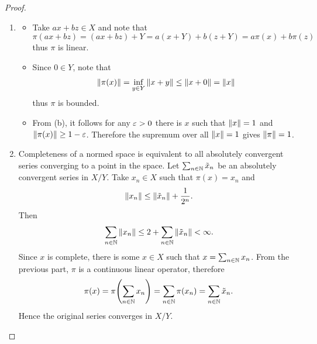 \documentclass[hw_all.tex]{subfiles}
\begin{document}
\begin{proof}
\begin{enumerate}
        \item 
            \begin{itemize}
                \item
                    Take $ax + bz \in X$ and note that
                    \[
                        \pi(ax + bz) = (ax + bz) + Y = a(x + Y) + b(z + Y) = a \pi(x) + b \pi(z)
                    \]
                    thus $\pi$ is linear.

                \item 
                    Since $0 \in Y$, note that
                    \[
                        \norm{\pi(x)} = \inf_{y \in Y} \norm{x + y} \leq \norm{x + 0} = \norm{x}
                    \]
                    thus $\pi$ is bounded.

                \item 
                    From (b), it follows for any $\varepsilon > 0$ there is $x$ such that $\norm{x} = 1$ and $\norm{\pi(x)} \geq 1 - \varepsilon$. Therefore the supremum over all $\norm{x} = 1$ gives $\norm{\pi} = 1$.
            \end{itemize}

        \item 
            Completeness of a normed space is equivalent to all absolutely convergent series converging to a point in the space. Let $\sum_{n \in \mathbb{N}} \tilde{x}_n$ be an absolutely convergent series in $X / Y$. Take $x_n \in X$ such that $\pi(x) = x_n$ and
            \[
                \norm{x_n} \leq \norm{\tilde{x}_n} + \frac{1}{2^n}
            .\]
            Then
            \[
                \sum_{n \in \mathbb{N}} \norm{x_n} \leq 2 + \sum_{n \in \mathbb{N}} \norm{\tilde{x}_n} < \infty
            .\]
            Since $x$ is complete, there is some $x \in X$ such that $x = \sum_{n \in \mathbb{N}} x_n$. From the previous part, $\pi$ is a continuous linear operator, therefore
            \[
                \pi(x) = \pi\qty(\sum_{n \in \mathbb{N}} x_n) = \sum_{n \in \mathbb{N}} \pi(x_n) = \sum_{n \in \mathbb{N}} \tilde{x}_n
            .\]
            Hence the original series converges in $X / Y$.
    \end{enumerate}
\end{proof}
\end{document}
